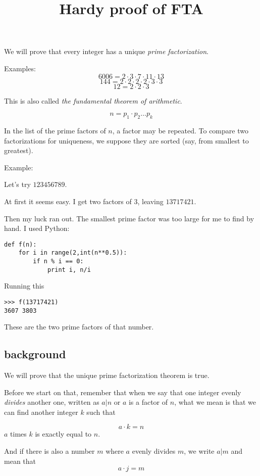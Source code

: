 \documentclass[11pt, oneside]{article}
\title{Hardy proof of FTA}
\date{}
\begin{document}
\maketitle
\Large

We will prove that every integer has a unique \emph{prime factorization}.  

Examples:
\[ 6006 = 2 \cdot 3 \cdot 7 \cdot 11 \cdot 13 \]
\[ 144 = 2 \cdot 2 \cdot 2 \cdot 2 \cdot 3 \cdot 3 \]
\[ 12 = 2 \cdot 2 \cdot 3 \]

This is also called \emph{the fundamental theorem of arithmetic}.

\[ n = p_1 \cdot p_2 \dots p_k \]

In the list of the prime factors of $n$, a factor may be repeated.  To compare two factorizations for uniqueness, we suppose they are sorted (say, from smallest to greatest).

Example:

Let's try $123456789$.  

At first it seems easy.  I get two factors of $3$, leaving $13717421$.

Then my luck ran out.  The smallest prime factor was too large for me to find by hand.  I used Python:

\begin {verbatim}
def f(n):
    for i in range(2,int(n**0.5)):
        if n %
            print i, n/i
\end{verbatim}

Running this

\begin{verbatim}
>>> f(13717421)
3607 3803
\end{verbatim}

These are the two prime factors of that number.

\subsection*{background}

We will prove that the unique prime factorization theorem is true.

Before we start on that, remember that when we say that one integer evenly \emph{divides} another one, written as $a|n$ or $a$ is a factor of $n$, what we mean is that we can find another integer $k$ such that

\[ a \cdot k = n \]
$a$ times $k$ is exactly equal to $n$.

And if there is also a number $m$ where $a$ evenly divides $m$, we write $a|m$ and mean that
\[ a \cdot j = m \]
\end{document}
